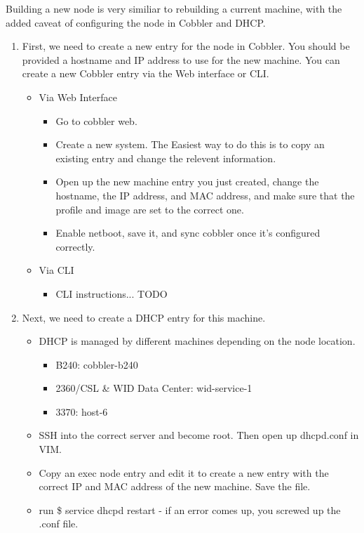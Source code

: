 \documentclass[10pt,letterpaper]{article}
\begin{document}
    Building a new node is very similiar to rebuilding a current machine, with the
    added caveat of configuring the node in Cobbler and DHCP.
    \begin{enumerate}
        \item First, we need to create a new entry for the node in Cobbler. You
        should be provided a hostname and IP address to use for the new machine.
        You can create a new Cobbler entry via the Web interface or CLI.
        \begin{itemize}
            \item Via Web Interface
            \begin{itemize}
                \item Go to cobbler web.
                \item Create a new system. The Easiest way to do this is to copy
                an existing entry and change the relevent information.
                \item Open up the new machine entry you just created, change the
                hostname, the IP address, and MAC address, and make sure that
                the profile and image are set to the correct one.
                \item Enable netboot, save it, and sync cobbler once it's configured
                correctly.
            \end{itemize}
            \item Via CLI
            \begin{itemize}
                \item CLI instructions... TODO
            \end{itemize}
        \end{itemize}
        \item Next, we need to create a DHCP entry for this machine.
        \begin{itemize}
            \item DHCP is managed by different machines depending on the node location.
            \begin{itemize}
                \item B240: cobbler-b240
                \item 2360/CSL \& WID Data Center: wid-service-1
                \item 3370: host-6
            \end{itemize}
            \item SSH into the correct server and become root. Then open up dhcpd.conf in VIM.
            \item Copy an exec node entry and edit it to create a new entry with the
            correct IP and MAC address of the new machine. Save the file.
            \item run {\selectfont \$ service dhcpd restart } - if
            an error comes up, you screwed up the .conf file.
        \end{itemize}
    \end{enumerate}
\clearpage
\end{document}

